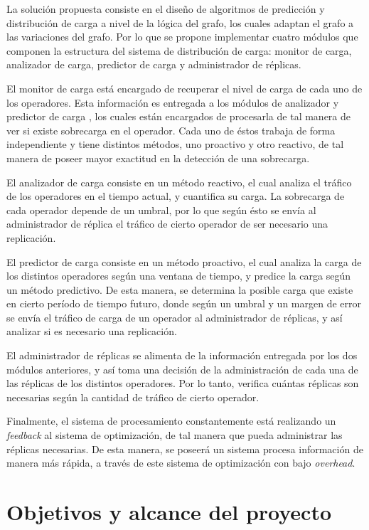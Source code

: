 La solución propuesta consiste en el dise\~no de algoritmos de predicci\'on y distribuci\'on de carga a nivel de la l\'ogica del grafo, los cuales adaptan el grafo a las variaciones del grafo. Por lo que se propone implementar cuatro módulos que componen la estructura del sistema de distribución de carga: monitor de carga, analizador de carga, predictor de carga y administrador de réplicas.

El monitor de carga está encargado de recuperar el nivel de carga de cada uno de los operadores. Esta información es entregada a los módulos de analizador y predictor de carga , los cuales están encargados de procesarla de tal manera de ver si existe sobrecarga en el operador. Cada uno de éstos trabaja de forma independiente y tiene distintos métodos, uno proactivo y otro reactivo, de tal manera de poseer mayor exactitud en la detección de una sobrecarga.

El analizador de carga consiste en un método reactivo, el cual analiza el tráfico de los operadores en el tiempo actual, y cuantifica su carga. La sobrecarga de cada operador depende de un umbral, por lo que según ésto se envía al administrador de réplica el tráfico de cierto operador de ser necesario una replicación.

El predictor de carga consiste en un método proactivo, el cual analiza la carga de los distintos operadores según una ventana de tiempo, y predice la carga según un método predictivo. De esta manera, se determina la posible carga que existe en cierto período de tiempo futuro, donde según un umbral y un margen de error se envía el tráfico de carga de un operador al administrador de réplicas, y así analizar si es necesario una replicación.

El administrador de réplicas se alimenta de la información entregada por los dos módulos anteriores, y así toma una decisión de la administración de cada una de las réplicas de los distintos operadores. Por lo tanto, verifica cuántas réplicas son necesarias según la cantidad de tráfico de cierto operador.

Finalmente, el sistema de procesamiento constantemente está realizando un \textit{feedback} al sistema de optimización, de tal manera que pueda administrar las réplicas necesarias. De esta manera, se poseerá un sistema procesa información de manera más rápida, a través de este sistema de optimización con bajo \textit{overhead}.


\section{Objetivos y alcance del proyecto}
\label{intro:objetivos}


